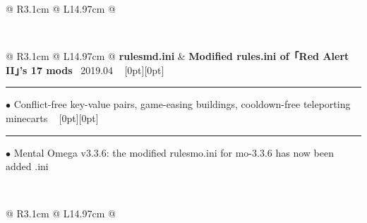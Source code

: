 {{\begin{tabularx}{\linewidth}{@{} R{3.1cm} @{\phantom{d}} L{14.97cm} @{}}
\end{tabularx}
\\
\begin{tabularx}{\linewidth}{@{} R{3.1cm} @{\phantom{d}} L{14.97cm} @{}}
	\textbf{rulesmd.ini} & \hspace{10pt} \textbf{Modified rules.ini of「Red Alert II」's 17 mods} \hfill \textendash\ 2019.04 \newline \vspace{2pt} \ \hspace{-3pt} \raisebox{0.09\height}[0pt][0pt]{\vrule width0.5pt height30.0pt} \hspace{-0.26em}\rule[0.25em]{1.0em}{0.5pt}\!\! $\bullet$ {\small Conflict-free key-value pairs, game-easing buildings, cooldown-free teleporting minecarts} \newline \vspace{-3pt} \ \hspace{-3pt} \raisebox{0.18\height}[0pt][0pt]{\vrule width0.5pt height15.0pt} \hspace{-0.26em}\rule[0.25em]{1.0em}{0.5pt}\!\! $\bullet$ {\small Mental Omega v3.3.6: the modified rulesmo.ini for mo-3.3.6 has now been added} \hfill {\small \color{color-detail} .ini} \href{https://github.com/ChenZhu-Xie/postgraduate_courses/tree/master/3__2.2__Engineering_Course/3__2.3__Labview__1.0_year/\%E8\%99\%9A\%E6\%8B\%9F\%E4\%BB\%AA\%E5\%99\%A82021\%E8\%AF\%BE\%E8\%AE\%BE_\%E9\%80\%89\%E9\%A2\%98\%E4\%B8\%80_\%E8\%B0\%A2\%E5\%B0\%98\%E7\%AB\%B9}{\color{black!50}\faGithub} \\ \Gap\Gap\Gap
\end{tabularx}
\\
\begin{tabularx}{\linewidth}{@{} R{3.1cm} @{\phantom{d}} L{14.97cm} @{}}

\end{tabularx}}}
